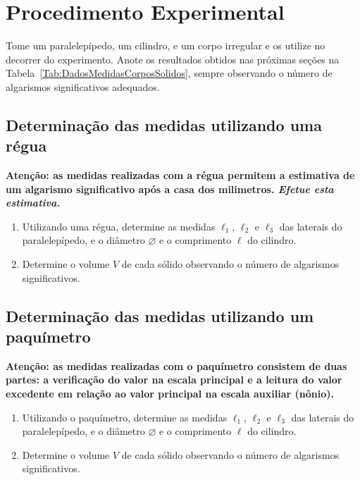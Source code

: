 \section{Procedimento Experimental}

Tome um paralelepípedo, um cilindro, e um corpo irregular e os utilize no decorrer do experimento. Anote os resultados obtidos nas próximas seções na Tabela~\ref{Tab:DadosMedidasCorposSolidos}, sempre observando o número de algarismos significativos adequados.

\subsection{Determinação das medidas utilizando uma régua}

\textbf{Atenção: as medidas realizadas com a régua permitem a estimativa de um algarismo significativo após a casa dos milimetros. \emph{Efetue esta estimativa.}}

\begin{enumerate}
\item Utilizando uma régua, determine as medidas $\ell_1$, $\ell_2$ e $\ell_3$ das laterais do paralelepípedo, e o diâmetro $\diameter$ e o comprimento $\ell$ do cilindro. 
\item Determine o volume $V$ de cada sólido observando o número de algarismos significativos.
\end{enumerate}

\subsection{Determinação das medidas utilizando um paquímetro}

\textbf{Atenção: as medidas realizadas com o paquímetro consistem de duas partes: a verificação do valor na escala principal e a leitura do valor excedente em relação ao valor principal na escala auxiliar (nônio).}

\begin{enumerate}
\item Utilizando o paquímetro, determine as medidas $\ell_1$, $\ell_2$ e $\ell_3$ das laterais do paralelepípedo, e o diâmetro $\diameter$ e o comprimento $\ell$ do cilindro.
\item Determine o volume $V$ de cada sólido observando o número de algarismos significativos.
\end{enumerate}

